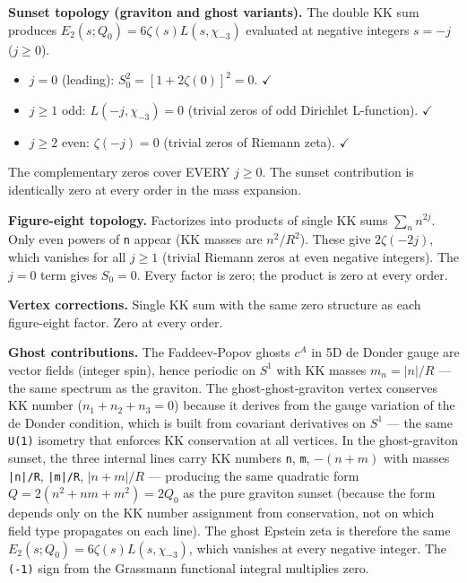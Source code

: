 \documentclass[aps,prd,preprint,superscriptaddress,longbibliography,floatfix]{revtex4-2}
\theoremstyle{remark}
\begin{document}
\textbf{Sunset topology (graviton and ghost variants).} The double KK sum produces $E_{2}(s; Q_{0}) = 6\zeta(s)L(s,\chi_{-3})$ evaluated at negative integers $s = -j$ ($j \geq 0$).


\begin{itemize}
  \item $j = 0$ (leading): $S_{0}^{2} = [1 + 2\zeta(0)]^{2} = 0$. $\checkmark$
  \item $j \geq 1$ odd: $L(-j, \chi_{-3}) = 0$ (trivial zeros of odd Dirichlet L-function). $\checkmark$
  \item $j \geq 2$ even: $\zeta(-j) = 0$ (trivial zeros of Riemann zeta). $\checkmark$
\end{itemize}

The complementary zeros cover EVERY $j \geq 0$. The sunset contribution is identically zero at every order in the mass expansion.

\textbf{Figure-eight topology.} Factorizes into products of single KK sums $\sum_n n^{2j}$. Only even powers of \texttt{n} appear (KK masses are $n^{2}/R^{2}$). These give $2\zeta(-2j)$, which vanishes for all $j \geq 1$ (trivial Riemann zeros at even negative integers). The $j = 0$ term gives $S_{0} = 0$. Every factor is zero; the product is zero at every order.

\textbf{Vertex corrections.} Single KK sum with the same zero structure as each figure-eight factor. Zero at every order.

\textbf{Ghost contributions.} The Faddeev-Popov ghosts $c^A$ in 5D de Donder gauge are vector fields (integer spin), hence periodic on $S^{1}$ with KK masses $m_n = |n|/R$ --- the same spectrum as the graviton. The ghost-ghost-graviton vertex conserves KK number ($n_{1} + n_{2} + n_{3} = 0$) because it derives from the gauge variation of the de Donder condition, which is built from covariant derivatives on $S^{1}$ --- the same \texttt{U(1)} isometry that enforces KK conservation at all vertices. In the ghost-graviton sunset, the three internal lines carry KK numbers \texttt{n}, \texttt{m}, $-(n+m)$ with masses \texttt{|n|/R}, \texttt{|m|/R}, $|n+m|/R$ --- producing the same quadratic form $Q = 2(n^{2} + nm + m^{2}) = 2Q_{0}$ as the pure graviton sunset (because the form depends only on the KK number assignment from conservation, not on which field type propagates on each line). The ghost Epstein zeta is therefore the same $E_{2}(s; Q_{0}) = 6\zeta(s)L(s,\chi_{-3})$, which vanishes at every negative integer. The \texttt{(-1)} sign from the Grassmann functional integral multiplies zero.
\end{document}
